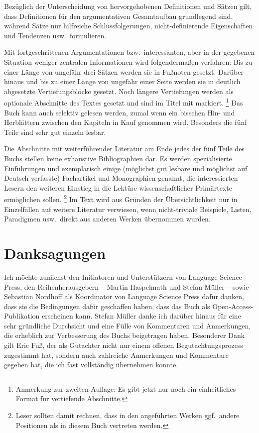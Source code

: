 Bezüglich der Unterscheidung von hervorgehobenen Definitionen und Sätzen gilt, dass Definitionen für den argumentativen Gesamtaufbau grundlegend sind, während Sätze nur hilfreiche Schlussfolgerungen, nicht-definierende Eigenschaften und Tendenzen usw.\ formulieren.

Mit fortgeschrittenen Argumentationen bzw.\ interessanten, aber in der gegebenen Situation weniger zentralen Informationen wird folgendermaßen verfahren:
Bis zu einer Länge von ungefähr drei Sätzen werden sie in Fußnoten gesetzt.
Darüber hinaus und bis zu einer Länge von ungefähr einer Seite werden sie in deutlich abgesetzte Vertiefungsblöcke gesetzt.
Noch längere Vertiefungen werden als optionale Abschnitte des Textes gesetzt und sind im Titel mit \Opsional markiert.%
\footnote{Anmerkung zur zweiten Auflage:
Es gibt jetzt nur noch ein einheitliches Format für vertiefende Abschnitte.}
Das Buch kann auch selektiv gelesen werden, zumal wenn ein bisschen Hin- und Herblättern zwischen den Kapiteln in Kauf genommen wird.
Besonders die fünf Teile sind sehr gut einzeln lesbar.

Die Abschnitte mit weiterführender Literatur am Ende jedes der fünf Teile des Buchs stellen keine exhaustive Bibliographien dar.
Es werden spezialisierte Einführungen und exemplarisch einige (möglichst gut lesbare und möglichst auf Deutsch verfasste) Fachartikel und Monographien genannt, die interessierten Lesern den weiteren Einstieg in die Lektüre wissenschaftlicher Primärtexte ermöglichen sollen.%
\footnote{Leser sollten damit rechnen, dass in den angeführten Werken ggf.\ andere Positionen als in diesem Buch vertreten werden.}
Im Text wird aus Gründen der Übersichtlichkeit nur in Einzelfällen auf weitere Literatur verwiesen, \zB wenn nicht-triviale Beispiele, Listen, Paradigmen usw.\ direkt aus anderen Werken übernommen wurden.

\section*{Danksagungen}

Ich möchte zunächst den Initiatoren und Unterstützern von Language Science Press, den Reihenherausgebern -- Martin Haspelmath und Stefan Müller -- sowie Sebastian Nordhoff als Koordinator von Language Science Press dafür danken, dass sie die Bedingungen dafür geschaffen haben, dass das Buch als Open-Access-Publikation erscheinen kann.
Stefan Müller danke ich darüber hinaus für eine sehr gründliche Durchsicht und eine Fülle von Kommentaren und Anmerkungen, die erheblich zur Verbesserung des Buchs beigetragen haben.
Besonderer Dank gilt Eric Fuß, der als Gutachter nicht nur einem offenen Begutachtungsprozess zugestimmt hat, sondern auch zahlreiche Anmerkungen und Kommentare gegeben hat, die ich fast vollständig übernehmen konnte.


